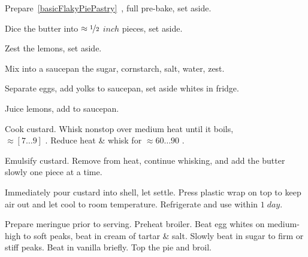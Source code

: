 \begin{preparation}
\item Prepare~\ref{basicFlakyPiePastry}~, full pre-bake, set aside.

\item Dice the butter into $\approx\nicefrac{1}{2}$ $inch$ pieces, set aside.

\item Zest the lemons, set aside.

\item Mix into a saucepan the sugar, cornstarch, salt, water, zest.

\item Separate eggs, add yolks to saucepan, set aside whites in fridge.

\item Juice lemons, add to saucepan.

\item Cook custard.
	Whisk nonstop over medium heat until it boils,\\ $\approx[7\dots9]$ \minute.
	Reduce heat \& whisk for $\approx 60 \dots 90$ \second.

\item Emulsify custard.
	Remove from heat, continue whisking, and add the butter slowly one piece at a time.

\item Immediately pour custard into shell, let settle.
	Press plastic wrap on top to keep air out and let cool to room temperature.
	Refrigerate and use within $1\; day$.

\item Prepare meringue prior to serving.
	Preheat broiler.
	Beat egg whites on medium-high to soft peaks, beat in cream of tartar \& salt.
	Slowly beat in sugar to firm or stiff peaks.
	Beat in vanilla briefly. Top the pie and broil.
\end{preparation}


\recipeend%
